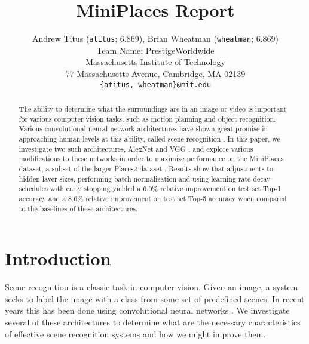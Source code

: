 \documentclass[10pt,twocolumn,letterpaper]{article}
\begin{document}
\title{MiniPlaces Report}

\author{Andrew Titus (\texttt{atitus}; 6.869), Brian Wheatman (\texttt{wheatman}; 6.869)\\
Team Name: PrestigeWorldwide \\
Massachusetts Institute of Technology\\
77 Massachusetts Avenue, Cambridge, MA 02139\\
{\tt\small \{atitus, wheatman\}@mit.edu}
}

\maketitle

\begin{abstract}
The ability to determine what the surroundings are
in an image or video is important for various computer vision tasks,
such as motion planning and object recognition. Various
convolutional neural network architectures have shown great
promise in approaching human levels at this ability, called
scene recognition \cite{Places}. In this paper, we
investigate two such architectures, AlexNet \cite{AlexNet}
and VGG \cite{VGG}, and explore various modifications to these
networks in order to maximize performance on the MiniPlaces
dataset, a subset of the larger Places2 dataset \cite{Places}.
Results show that adjustments to hidden layer sizes, performing
batch normalization and using learning rate decay schedules with
early stopping yielded a $6.0\%$
relative improvement on test set Top-1 accuracy and a
$8.6\%$ relative improvement
on test set Top-5 accuracy when compared to the baselines of these
architectures.
\end{abstract}

\section{Introduction}
Scene recognition is a classic task in computer vision.  Given an image, a system seeks to label the image with a class from some set of predefined scenes.  In recent years this has been done using convolutional neural networks\cite{AlexNet} \cite{VGG}.  We investigate several of these architectures to determine what are the necessary characteristics of effective scene recognition systems and how we might improve them.  
\end{document}
